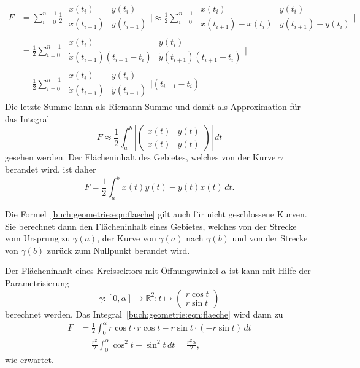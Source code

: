 \begin{align*}
F
&=
\sum_{i=0}^{n-1}
\frac12
\biggl|\begin{matrix}
x(t_i)    &y(t_i)    \\
x(t_{i+1})&y(t_{i+1})
\end{matrix}\biggr|
\approx
\frac12
\sum_{i=0}^{n-1}
\biggl|\begin{matrix}
x(t_i)    &y(t_i)    \\
x(t_{i+1})-x(t_i)&y(t_{i+1})-y(t_i)
\end{matrix}\biggr|
\\
&=
\frac12
\sum_{i=0}^{n-1}
\biggl|\begin{matrix}
x(t_i)                        &y(t_i)    \\
\dot{x}(t_{i+1}) (t_{i+1}-t_i)& \dot{y}(t_{i+1}) (t_{i+1}-t_i)
\end{matrix}\biggr|
\\
&=
\frac12
\sum_{i=0}^{n-1}
\biggl|\begin{matrix}
x(t_i)           &y(t_i)    \\
\dot{x}(t_{i+1}) & \dot{y}(t_{i+1})
\end{matrix}\biggr|
(t_{i+1}-t_{i})
\end{align*}
Die letzte Summe kann als Riemann-Summe und damit als Approximation für
das Integral
\[
F
\approx
\frac12
\int_a^b
\left|\begin{pmatrix} x(t)&y(t)\\\dot{x}(t)&\dot{y}(t)\end{pmatrix}\right|
\,dt
\]
gesehen werden.
Der Flächeninhalt des Gebietes, welches von der Kurve $\gamma$
berandet wird, ist daher
\begin{equation}
F
=
\frac12
\int_a^b x(t)\dot{y}(t)-y(t)\dot{x}(t)\,dt.
\label{buch:geometrie:eqn:flaeche}
\end{equation}

Die Formel~\eqref{buch:geometrie:eqn:flaeche} gilt auch für nicht
geschlossene Kurven.
Sie berechnet dann den Flächeninhalt eines Gebietes, welches von
der Strecke vom Ursprung zu $\gamma(a)$, der Kurve von $\gamma(a)$ nach
$\gamma(b)$ und von der Strecke von $\gamma(b)$ zurück zum Nullpunkt
berandet wird.

\begin{beispiel}
Der Flächeninhalt eines Kreissektors mit Öffnungswinkel $\alpha$ ist
kann mit Hilfe der Parametrisierung
\[
\gamma
\colon
[0,\alpha] \to \mathbb{R}^2
:
t\mapsto \begin{pmatrix}r\cos t\\ r\sin t\end{pmatrix}
\]
berechnet werden.
Das Integral~\eqref{buch:geometrie:eqn:flaeche} wird dann zu
\begin{align*}
F
&=
\frac12
\int_0^\alpha r\cos t \cdot r\cos t - r\sin t \cdot (-r\sin t)\,dt
\\
&=
\frac{r^2}2
\int_0^\alpha
\cos^2t + \sin^2t\,dt
=
\frac{r^2\alpha}2,
\end{align*}
wie erwartet.
\end{beispiel}

